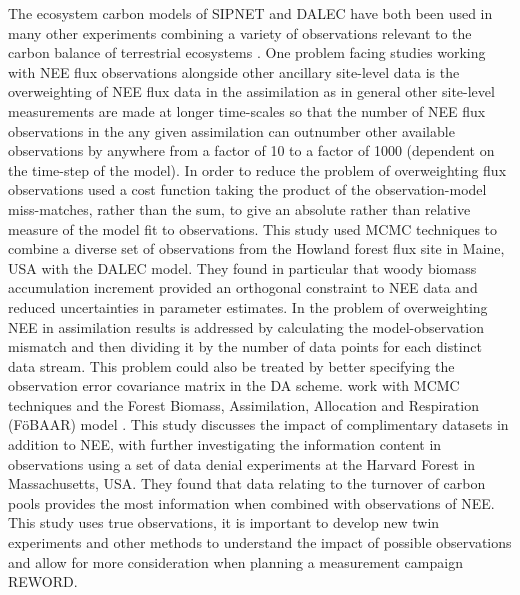 \documentclass[12pt]{article}
\begin{document}
The ecosystem carbon models of SIPNET and DALEC have both been used in many other experiments combining a variety of observations relevant to the carbon balance of terrestrial ecosystems \citep{Zobitz2008, Moore20081467, Sacks2007, Keenan2011}. One problem facing studies working with NEE flux observations alongside other ancillary site-level data is the overweighting of NEE flux data in the assimilation as in general other site-level measurements are made at longer time-scales so that the number of NEE flux observations in the any given assimilation can outnumber other available observations by anywhere from a factor of 10 to a factor of 1000 (dependent on the time-step of the model). In order to reduce the problem of overweighting flux observations \citet{richardson2010estimating} used a cost function taking the product of the observation-model miss-matches, rather than the sum, to give an absolute rather than relative measure of the model fit to observations. This study used MCMC techniques to combine a diverse set of observations from the Howland forest flux site in Maine, USA with the DALEC model. They found in particular that woody biomass accumulation increment provided an orthogonal constraint to NEE data and reduced uncertainties in parameter estimates. In \citet{Keenan2012} the problem of overweighting NEE in assimilation results is addressed by calculating the model-observation mismatch and then dividing it by the number of data points for each distinct data stream. This problem could also be treated by better specifying the observation error covariance matrix in the DA scheme. \citet{Keenan2012} work with MCMC techniques and the Forest Biomass, Assimilation, Allocation and Respiration (F\"{o}BAAR) model . This study discusses the impact of complimentary datasets in addition to NEE, with \citet{Keenan2013} further investigating the information content in observations using a set of data denial experiments at the Harvard Forest in Massachusetts, USA. They found that data relating to the turnover of carbon pools provides the most information when combined with observations of NEE. This study uses true observations, it is important to develop new twin experiments and other methods to understand the impact of possible observations and allow for more consideration when planning a measurement campaign {\color{red}REWORD}.  
\end{document}
